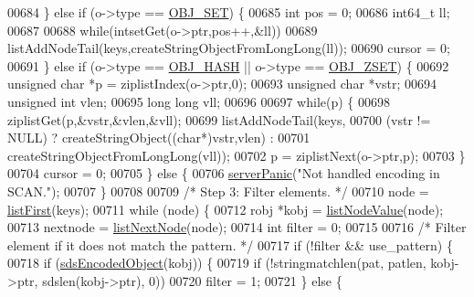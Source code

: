 \begin{DoxyCode}
00684     \} \textcolor{keywordflow}{else} \textcolor{keywordflow}{if} (o->type == \hyperlink{server_8h_a8d179375a4aac33d3fa7aa80c8ccc75f}{OBJ\_SET}) \{
00685         \textcolor{keywordtype}{int} pos = 0;
00686         int64\_t ll;
00687 
00688         \textcolor{keywordflow}{while}(intsetGet(o->ptr,pos++,&ll))
00689             listAddNodeTail(keys,createStringObjectFromLongLong(ll));
00690         cursor = 0;
00691     \} \textcolor{keywordflow}{else} \textcolor{keywordflow}{if} (o->type == \hyperlink{server_8h_a87c05ba4f7f36741864277f02a4423fb}{OBJ\_HASH} || o->type == \hyperlink{server_8h_a8c356422ddbc03bd77694880a30a1953}{OBJ\_ZSET}) \{
00692         \textcolor{keywordtype}{unsigned} \textcolor{keywordtype}{char} *p = ziplistIndex(o->ptr,0);
00693         \textcolor{keywordtype}{unsigned} \textcolor{keywordtype}{char} *vstr;
00694         \textcolor{keywordtype}{unsigned} \textcolor{keywordtype}{int} vlen;
00695         \textcolor{keywordtype}{long} \textcolor{keywordtype}{long} vll;
00696 
00697         \textcolor{keywordflow}{while}(p) \{
00698             ziplistGet(p,&vstr,&vlen,&vll);
00699             listAddNodeTail(keys,
00700                 (vstr != NULL) ? createStringObject((\textcolor{keywordtype}{char}*)vstr,vlen) :
00701                                  createStringObjectFromLongLong(vll));
00702             p = ziplistNext(o->ptr,p);
00703         \}
00704         cursor = 0;
00705     \} \textcolor{keywordflow}{else} \{
00706         \hyperlink{server_8h_a11cc378e7778a830b41240578de3b204}{serverPanic}(\textcolor{stringliteral}{"Not handled encoding in SCAN."});
00707     \}
00708 
00709     \textcolor{comment}{/* Step 3: Filter elements. */}
00710     node = \hyperlink{adlist_8h_aa8dc514bbe217bb2e87c1c77cfa84690}{listFirst}(keys);
00711     \textcolor{keywordflow}{while} (node) \{
00712         robj *kobj = \hyperlink{adlist_8h_af84cae230e7180ebcda1e2736fce9f65}{listNodeValue}(node);
00713         nextnode = \hyperlink{adlist_8h_a87e048b4eea3aa88f4101d59de50b0fc}{listNextNode}(node);
00714         \textcolor{keywordtype}{int} filter = 0;
00715 
00716         \textcolor{comment}{/* Filter element if it does not match the pattern. */}
00717         \textcolor{keywordflow}{if} (!filter && use\_pattern) \{
00718             \textcolor{keywordflow}{if} (\hyperlink{server_8h_afcfb5bd97af52d1dbce331745cae030c}{sdsEncodedObject}(kobj)) \{
00719                 \textcolor{keywordflow}{if} (!stringmatchlen(pat, patlen, kobj->ptr, sdslen(kobj->ptr), 0))
00720                     filter = 1;
00721             \} \textcolor{keywordflow}{else} \{

\end{DoxyCode}
